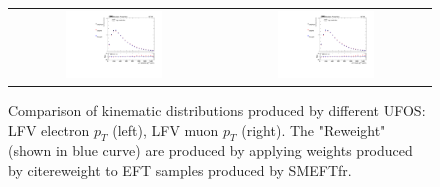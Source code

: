 \begin{figure}[tbh!]
 \begin{center}
 \begin{tabular}{cc}
  \includegraphics[width=0.48\textwidth]{figures/Part3/Samples/LFVePt}&
    \includegraphics[width=0.48\textwidth]{figures/Part3/Samples/LFVmuPt}\\
 \end{tabular}
 \caption{Comparison of kinematic distributions produced by different UFOS: LFV electron $p_{T}$ (left), LFV muon $p_{T}$ (right). The "Reweight" (shown in blue curve) are produced by applying weights produced by cite{reweight} to EFT samples produced by SMEFTfr.}
 \label{fig:reweight}
 \end{center}
\end{figure}

